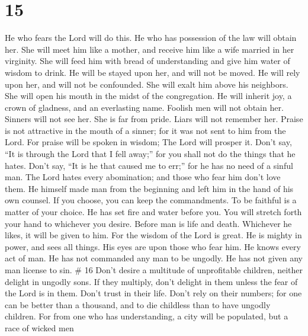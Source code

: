 \hypertarget{section-4}{%
\section{15}\label{section-4}}

 He who fears the Lord will do this. He who has possession
of the law will obtain her.  She will meet him like a
mother, and receive him like a wife married in her virginity.
 She will feed him with bread of understanding and give him
water of wisdom to drink.  He will be stayed upon her, and
will not be moved. He will rely upon her, and will not be confounded.
 She will exalt him above his neighbors. She will open his
mouth in the midst of the congregation.  He will inherit
joy, a crown of gladness, and an everlasting name.  Foolish
men will not obtain her. Sinners will not see her.  She is
far from pride. Liars will not remember her.  Praise is not
attractive in the mouth of a sinner; for it was not sent to him from the
Lord.  For praise will be spoken in wisdom; The Lord will
prosper it.  Don't say, ``It is through the Lord that I
fell away;'' for you shall not do the things that he hates.
 Don't say, ``It is he that caused me to err;'' for he has
no need of a sinful man.  The Lord hates every abomination;
and those who fear him don't love them.  He himself made
man from the beginning and left him in the hand of his own counsel.
 If you choose, you can keep the commandments. To be
faithful is a matter of your choice.  He has set fire and
water before you. You will stretch forth your hand to whichever you
desire.  Before man is life and death. Whichever he likes,
it will be given to him.  For the wisdom of the Lord is
great. He is mighty in power, and sees all things.  His
eyes are upon those who fear him. He knows every act of man.
 He has not commanded any man to be ungodly. He has not
given any man license to sin. \# 16  Don't desire a
multitude of unprofitable children, neither delight in ungodly sons.
 If they multiply, don't delight in them unless the fear of
the Lord is in them.  Don't trust in their life. Don't rely
on their numbers; for one can be better than a thousand, and to die
childless than to have ungodly children.  For from one who
has understanding, a city will be populated, but a race of wicked men
